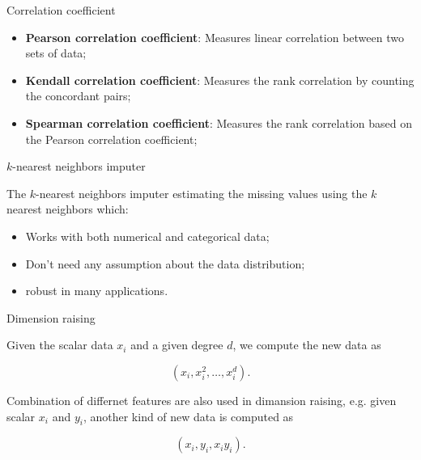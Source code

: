 \documentclass{beamer}
\begin{document}
\begin{frame}{Correlation coefficient  }

  \begin{itemize}
    \item \textbf{Pearson correlation coefficient}: Measures linear correlation between two sets of data; \vspace{.25cm}
    \item \textbf{Kendall correlation coefficient}: Measures the rank correlation by counting the concordant pairs; \vspace{.25cm}
    \item \textbf{Spearman correlation coefficient}: Measures the rank correlation based on the Pearson correlation coefficient; \vspace{.25cm}
  \end{itemize}

\end{frame}

\begin{frame}{$k$-nearest neighbors imputer  }

  The $k$-nearest neighbors imputer estimating the missing values using the $k$ nearest neighbors which: \vspace{.25cm}

  \begin{itemize}
    \item Works with both numerical and categorical data; \vspace{.25cm}
    \item Don't need any assumption about the data distribution; \vspace{.25cm}
    \item robust in many applications. \vspace{.25cm}
  \end{itemize}

\end{frame}

\begin{frame}{Dimension raising}

  Given the scalar data $x_i$ and a given degree $d$, we compute the new data as \vspace{.25cm}

  $$
    (x_i, x_i^2, \dots, x_i^d).
  $$ \vspace{.25cm}

  Combination of differnet features are also used in dimansion raising, e.g. given scalar $x_i$ and $y_i$, another kind of new data is computed as \vspace{.25cm}

  $$
    (x_i, y_i, x_i y_i).
  $$ \vspace{.25cm}

\end{frame}
\end{document}
